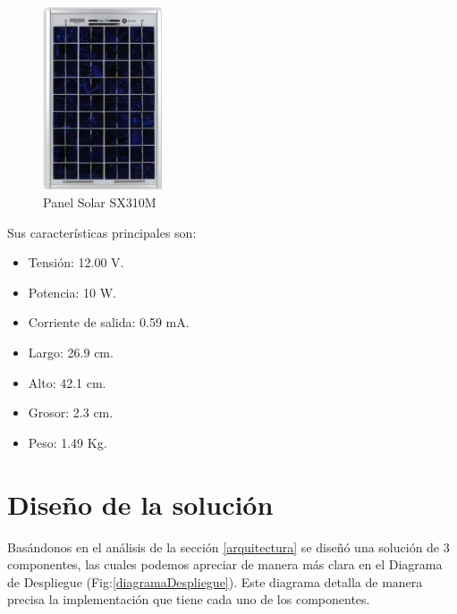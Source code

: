 \begin{figure}[h!]
        \centering
        \includegraphics[width=100pt]{images/panelSolar}
        \caption{Panel Solar SX310M} 
\end{figure}

Sus características principales son:\\

\begin{itemize}
\item Tensión: 12.00 V.
\item Potencia: 10 W.
\item Corriente de salida: 0.59 mA.
\item Largo: 26.9 cm.
\item Alto: 42.1 cm.
\item Grosor: 2.3 cm.
\item Peso: 1.49 Kg.
\end{itemize}

\newpage
\section{Diseño de la solución}
Basándonos en el análisis de la sección \ref{arquitectura} se diseñó una solución de 3 componentes, las cuales podemos apreciar de manera más clara en el Diagrama de Despliegue (Fig:\ref{diagramaDespliegue}). Este diagrama detalla de manera precisa la implementación que tiene cada uno de los componentes.\\

